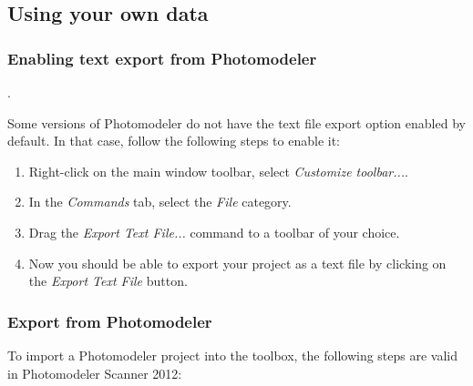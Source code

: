 \documentclass{article}
\begin{document}
\subsection{Using your own data}

\subsubsection{Enabling text export from Photomodeler}
\label{sec:enableTextExport}.

Some versions of Photomodeler do not have the text file export option
enabled by default. In that case, follow the following steps to enable
it:
\begin{enumerate}
\item Right-click on the main window toolbar, select \emph{Customize toolbar...}.
\item In the \emph{Commands} tab, select the \emph{File} category.
\item Drag the \emph{Export Text File...} command to a toolbar of
  your choice.
\item Now you should be able to export your project as a text file by
  clicking on the \emph{Export Text File} button.
\end{enumerate}

\subsubsection{Export from Photomodeler}

To import a Photomodeler project into the toolbox, the following
steps are valid in Photomodeler Scanner 2012:
\end{document}
